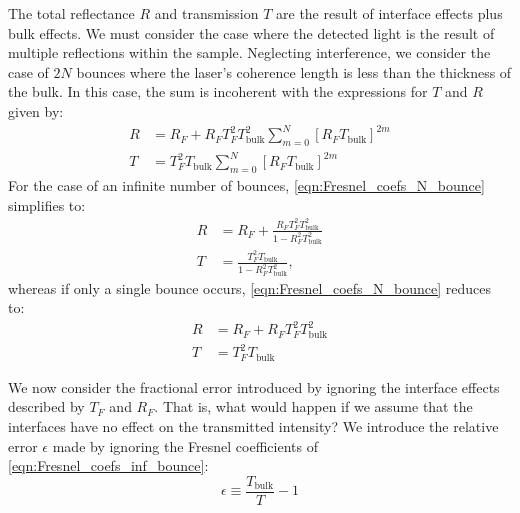 The total reflectance $R$ and transmission $T$ are the result of interface effects plus bulk effects. We must consider the case where the detected light is the result of multiple reflections within the sample. Neglecting interference, we consider the case of $2N$ bounces where the laser's coherence length is less than the thickness of the bulk. In this case, the sum is incoherent with the expressions for $T$ and $R$ given by:
\begin{equation}
	\begin{aligned}
		R &= R_F + R_F T_F^2 T_{\text{bulk}}^2 \sum_{m=0}^{N} \left[ R_F T_{\text{bulk}} \right]^{2m} \\
		T &= T_F^2 T_{\text{bulk}} \sum_{m=0}^{N} \left[ R_F T_{\text{bulk}} \right]^{2m}
	\end{aligned}
	\label{eqn:Fresnel_coefs_N_bounce}
\end{equation}
For the case of an infinite number of bounces, \cref{eqn:Fresnel_coefs_N_bounce} simplifies to:
\begin{equation}
	\begin{aligned}
		R &= R_F + \frac{R_F T_F^2 T_{\text{bulk}}^2}{1-R_F^2 T_{\text{bulk}}^2} \\
		T &= \frac{T_F^2 T_{\text{bulk}}}{1-R_F^2 T_{\text{bulk}}^2},
	\end{aligned}
	\label{eqn:Fresnel_coefs_inf_bounce}
\end{equation}
whereas if only a single bounce occurs, \cref{eqn:Fresnel_coefs_N_bounce} reduces to:
\begin{equation}
	\begin{aligned}
		R &= R_F + R_F T_F^2 T_{\text{bulk}}^2 \\
		T &= T_F^2 T_{\text{bulk}}
	\end{aligned}
	\label{eqn:Fresnel_coefs_1_bounce}
\end{equation}

We now consider the fractional error introduced by ignoring the interface effects described by $T_F$ and $R_F$. That is, what would happen if we assume that the interfaces have no effect on the transmitted intensity? We introduce the relative error $\epsilon$ made by ignoring the Fresnel coefficients of \cref{eqn:Fresnel_coefs_inf_bounce}:
\begin{equation}
	\epsilon \equiv \frac{T_{\text{bulk}}}{T} - 1
	\label{eqn:Fresnel_rel_err}
\end{equation}

